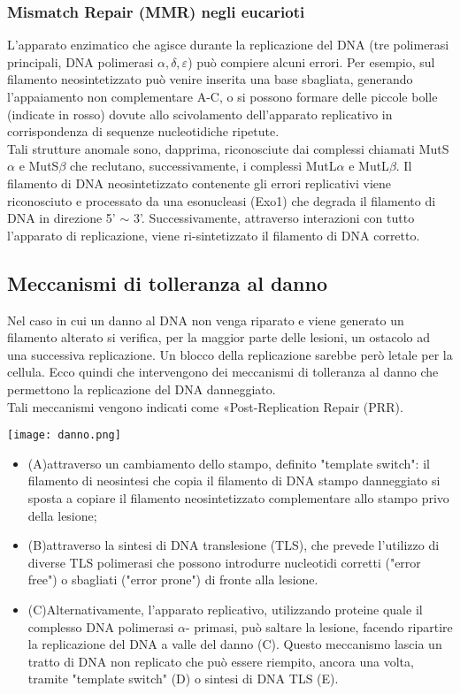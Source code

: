 \documentclass{article}
\begin{document}
\subsubsection{Mismatch Repair (MMR) negli eucarioti}
L'apparato enzimatico che agisce durante la replicazione del DNA (tre polimerasi principali, DNA polimerasi $\alpha, \delta, \varepsilon$) può
compiere alcuni errori. Per esempio, sul filamento neosintetizzato può venire inserita
una base sbagliata, generando l'appaiamento non complementare A-C, o si possono formare delle piccole bolle (indicate in rosso) dovute allo scivolamento
dell'apparato replicativo in corrispondenza di sequenze nucleotidiche ripetute.\\
Tali strutture anomale sono, dapprima, riconosciute dai complessi chiamati MutS$\alpha$ e MutS$\beta$ che reclutano, successivamente, i complessi MutL$\alpha$ e MutL$\beta$.
Il filamento di DNA neosintetizzato contenente gli errori replicativi viene riconosciuto e processato da una esonucleasi (Exo1) che degrada il filamento di DNA in direzione 5' $\sim $ 3'.
Successivamente, attraverso interazioni con tutto l'apparato di replicazione, viene ri-sintetizzato il filamento di DNA corretto.
\subsection{Meccanismi di tolleranza al danno}Nel caso in cui un danno al DNA non venga riparato e viene
generato un filamento alterato si verifica, per la maggior parte delle lesioni, un ostacolo ad una successiva replicazione.
Un blocco della replicazione sarebbe però letale per la cellula. Ecco quindi che intervengono dei meccanismi di tolleranza al danno che permettono la replicazione del DNA danneggiato.\\
Tali meccanismi vengono indicati come «Post-Replication Repair (PRR).
\begin{center}
    \texttt{[image: danno.png]}
\end{center}
\begin{itemize}
    \item{(A)}attraverso un cambiamento dello stampo, definito "template switch": il filamento di neosintesi che copia
    il filamento di DNA stampo danneggiato si sposta a copiare il filamento neosintetizzato complementare
    allo stampo privo della lesione;
    \item{(B)}attraverso la sintesi di DNA translesione (TLS), che prevede l'utilizzo di diverse TLS polimerasi che
    possono introdurre nucleotidi corretti ("error free") o sbagliati ("error prone") di fronte alla lesione.
    \item{(C)}Alternativamente, l'apparato replicativo, utilizzando proteine quale il complesso DNA polimerasi $\alpha$-
    primasi, può saltare la lesione, facendo ripartire la replicazione del DNA a valle del danno (C). Questo
    meccanismo lascia un tratto di DNA non replicato che può essere riempito, ancora una volta, tramite
    "template switch" (D) o sintesi di DNA TLS (E).
\end{itemize}
\end{document}
